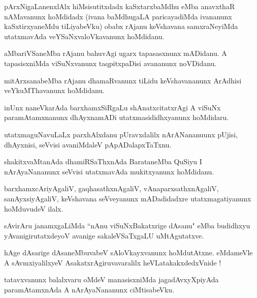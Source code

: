 \documentclass{article}
\begin{document}
\begin{mn}%
pArxNigaLanenxlAlx hiMsisutitxdadx kaSxtarxbaMdhu eMba anavxthaR nAMavanunx hoMdidadx (ivana 
baMdhugaLA paricayadiMda ivananunx kaSxtirxyaneMdu tiLiyabeVku) obabx rAjanu keVshavana 
samxraNeyiMda utatxmavAda veYSaNxvaloVkavanunx hoMdidanu.
\end{mn}

\begin{mn}%
aMbariVSaneMba rAjanu bahuvAgi ugarx tapasasxnunx mADidanu. A tapasisxniMda viSuNxvanunx 
taqpitxpaDisi avananunx noVDidanu.
\end{mn}

\begin{mn}%
mitArxsanabeMba rAjanu dhamaRvanunx tiLidu keVshavananunx ArAdhisi veYkuMThavanunx hoMdidanu.
\end{mn}

\begin{mn}%
inUnx naneVkarAda barxhamxSiRgaLu shAnatxcitatxrAgi A viSuNx paramAtamxnanunx dhAyxnamADi 
utatxmasididhxyanunx hoMdidaru.
\end{mn}

\begin{mn}%
utatxmaguNavuLaLx parxhAlxdanu pUravxdalilx nArANananuunx pUjisi, dhAyxnisi, seVvisi avaniMdaleV 
pApADalapxTaTxnu.
\end{mn}

\begin{mn}%
shakitxvaMtanAda dhamiRSaThxnAda BarataneMba QuSiyu I nArAyaNananunx seVvisi utatxmavAda 
mukitxyanunx hoMdidanu.
\end{mn}

\begin{mn}%
barxhamxcAriyAgaliV, gaqhasathxnAgaliV, vAnaparxsathxnAgaliV, sanAyxsiyAgaliV, keVshavana 
seVveyanunx mADadidadxre utatxmagatiyanunx hoMduvudeV ilalx.
\end{mn}

\begin{mn}%
sAvirAru janamxgaLiMda ``nAnu viSuNxBakatxrige dAsanu" eMba budidhxyu yAvanigirutatxdeyoV avanige 
sakaleVSaTxgaLU uMtAgutatxve.
\end{mn}

\begin{mn}%
hAge dAsarige dAsaneMbuvabeV sAloVkayxvanunx hoMdutAtxne. eMdameVle A sAvmxiyalilxyeV 
AsakatxrAgiruvavaralilx heVLatakakxdedxVnide !
\end{mn}

\begin{mn}%
tatavxvanunx balalxvaru oMdeV manasisxniMda jagadAvxyXpiyAda paramAtamxnAda A nArAyaNananunx 
ciMtisabeVku.
\end{mn}
\end{document}
